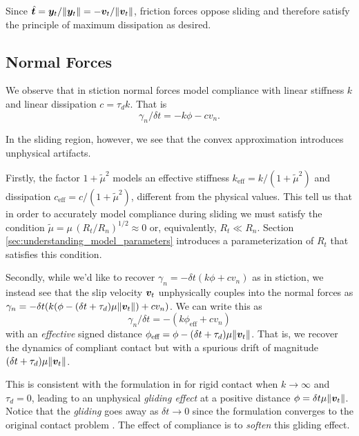 Since $\hat{{\bm{t}}} = {\bm{y}}_t/\Vert{\bm{y}}_t\Vert =
-{\bm{v}}_t/\Vert{\bm{v}}_t\Vert$, friction forces oppose sliding and therefore
satisfy the principle of maximum dissipation as desired.

\subsection{Normal Forces}
We observe that in stiction normal forces model compliance with linear
stiffness $k$ and linear dissipation $c = \tau_d k$. That is
\begin{equation}
    \gamma_n/ \delta t = -k\phi - c v_n.
\end{equation}

In the sliding region, however, we see that the convex approximation introduces
unphysical artifacts. 

Firstly, the factor $1+\tilde{\mu}^2$ models an effective stiffness
$k_\text{eff}=k/(1+\tilde{\mu}^2)$ and dissipation
$c_\text{eff}=c/(1+\tilde{\mu}^2)$, different from the physical values. This
tell us that in order to accurately model compliance during sliding we must
satisfy the condition $\tilde\mu=\mu\,(R_t/R_n)^{1/2} \approx 0$ or,
equivalently, $R_t \ll R_n$. Section \ref{sec:understanding_model_parameters}
introduces a parameterization of $R_t$ that satisfies this condition.

Secondly, while we'd like to recover $\gamma_n = -\delta t(k\phi + c v_n)$ as in
stiction, we instead see that the slip velocity ${\bm{v}}_t$
unphysically couples into the normal forces as $\gamma_n=-\delta
t(k(\phi-(\delta t+\tau_d)\mu\Vert{\bm{v}}_t\Vert) + cv_n)$. We can write this as
\begin{equation}
  \gamma_n/\delta t=-(k\phi_\text{eff} + c v_n)
\end{equation}
with an \textit{effective} signed distance $\phi_\text{eff} = \phi-(\delta
t+\tau_d)\mu\Vert{\bm{v}}_t\Vert$. That is, we recover the dynamics of compliant
contact but with a spurious drift of magnitude 
$(\delta t+\tau_d)\mu\Vert{\bm{v}}_t\Vert$.

This is consistent with the formulation in \cite{bib:anitescu2010} for rigid
contact when $k\rightarrow \infty$ and $\tau_d=0$, leading to an unphysical
\textit{gliding effect} at a positive distance $\phi=\delta
t\mu\Vert{\bm{v}}_t\Vert$. Notice that the \textit{gliding} goes away as $\delta
t\rightarrow 0$ since the formulation converges to the original contact problem
\cite{bib:anitescu2006}. The effect of compliance is to \textit{soften} this
gliding effect. 

